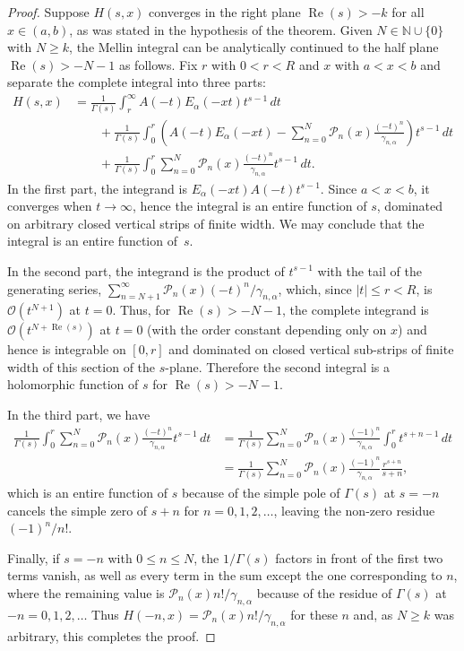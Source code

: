 \documentclass[a4paper]{amsart}
\newcommand{\N}{\mathbb{N}}
\newcommand{\Ea}{E_{\alpha}}
\newcommand{\calO}{\mathcal{O}}
\newcommand{\calP}{\mathcal{P}}
\renewcommand{\Re}{\operatorname{Re}}
\theoremstyle{plain}
\theoremstyle{definition}
\theoremstyle{remark}
\numberwithin{equation}{section}
\begin{document}
\begin{proof}
Suppose $H(s,x)$ converges in the right plane $\Re(s) > -k$ for all $x \in (a,b)$, as was stated in the hypothesis of the theorem.
Given $N \in \N \cup \{0\}$ with $N \geq k$, the Mellin integral can be analytically continued to the half plane $\Re(s) > -N-1$ as follows. Fix $r$ with $0 < r < R$ and $x$ with $a < x < b$ and separate the complete integral into three parts:
\begin{align*}
  H(s,x) &= \frac{1}{\Gamma(s)} \int_r^\infty A(-t) \Ea(-xt)t^{s-1}\,dt \\
  & \qquad + \frac{1}{\Gamma(s)} \int_0^{r} \left( A(-t) \Ea(-xt)
  - \sum_{n=0}^N \calP_{n}(x)\frac{(-t)^n}{\gamma_{n,\alpha}} \right)t^{s-1}\,dt \\
  & \qquad + \frac{1}{\Gamma(s)} \int_0^r \sum_{n=0}^N \calP_{n}(x) 
  \frac{(-t)^n}{\gamma_{n,\alpha}}t^{s-1} \,dt.
\end{align*}
In the first part, the integrand is $\Ea(-xt)A(-t)t^{s-1}$. Since $a<x<b$, it converges when $t \to \infty$, hence the integral is an entire function of $s$, dominated on arbitrary closed vertical strips of finite width. We may conclude that the integral is an entire function of~$s$.

In the second part, the integrand is the product of $t^{s-1}$ with the tail of the generating series, $\sum_{n=N+1}^{\infty} \calP_{n}(x) (-t)^{n}/\gamma_{n,\alpha}$, which, since $|t| \leq r < R$, is $\calO(t^{N+1})$ at $t=0$. Thus, for $\Re(s) > -N-1$, the complete integrand is $\calO(t^{N+\Re(s)})$ at $t=0$ (with the order constant depending only on $x$) and hence is integrable on $[0,r]$ and dominated on closed vertical sub-strips of finite width of this section of the $s$-plane. Therefore the second integral is a holomorphic function of $s$ for $\Re(s) > -N-1$.

In the third part, we have
\begin{align*}
\frac{1}{\Gamma(s)} \int_0^r \sum_{n=0}^N 
\calP_{n}(x) \frac{(-t)^n}{\gamma_{n,\alpha}}t^{s-1} \,dt 
& = \frac{1}{\Gamma(s)} \sum_{n=0}^N \calP_{n}(x) \frac{(-1)^n}{\gamma_{n,\alpha}}
\int_0^r t^{s+n-1} \,dt \\ 
& = \frac{1}{\Gamma(s)}\sum_{n=0}^N \calP_{n}(x) 
\frac{(-1)^n}{\gamma_{n,\alpha}} \frac{r^{s+n}}{s+n},
\end{align*}
which is an entire function of $s$ because of the simple pole of $\Gamma(s)$ at $s = -n$ cancels the simple zero of $s+n$ for $n=0,1,2,\dots$, leaving the non-zero residue $(-1)^n/n!$. 

Finally, if $s = -n$ with $0 \leq n \leq N$, the $1/\Gamma(s)$ factors in front of the first two terms vanish, as well as every term in the sum except the one corresponding to $n$, where the remaining value is $\calP_{n}(x)n!/\gamma_{n,\alpha}$ because of the residue of $\Gamma(s)$ at $-n = 0,1,2,\dots$ Thus $H(-n,x) = \calP_{n}(x)n!/\gamma_{n,\alpha}$ for these $n$ and, as $N \geq k$ was arbitrary, this completes the proof.
\end{proof}
\end{document}
